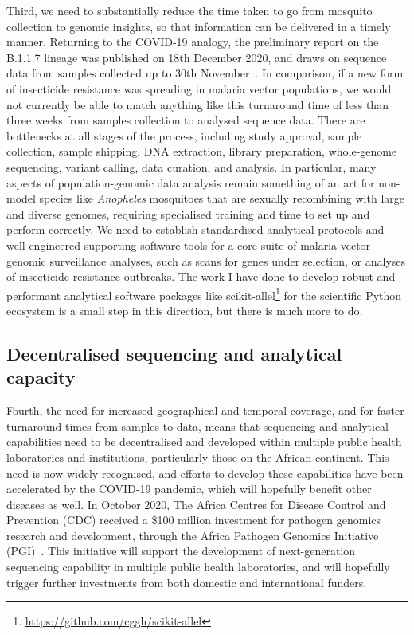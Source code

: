 \begin{refsection}
Third, we need to substantially reduce the time taken to go from mosquito collection to genomic insights, so that information can be delivered in a timely manner.
%
Returning to the COVID-19 analogy, the preliminary report on the B.1.1.7 lineage was published on 18th December 2020, and draws on sequence data from samples collected up to 30th November~\parencite{Rambaut2020}.
%
In comparison, if a new form of insecticide resistance was spreading in malaria vector populations, we would not currently be able to match anything like this turnaround time of less than three weeks from samples collection to analysed sequence data.
%
There are bottlenecks at all stages of the process, including study approval, sample collection, sample shipping, DNA extraction, library preparation, whole-genome sequencing, variant calling, data curation, and analysis.
%
In particular, many aspects of population-genomic data analysis remain something of an art for non-model species like \textit{Anopheles} mosquitoes that are sexually recombining with large and diverse genomes, requiring specialised training and time to set up and perform correctly.
%
We need to establish standardised analytical protocols and well-engineered supporting software tools for a core suite of malaria vector genomic surveillance analyses, such as scans for genes under selection, or analyses of insecticide resistance outbreaks.
%
The work I have done to develop robust and performant analytical software packages like scikit-allel\footnote{\url{https://github.com/cggh/scikit-allel}} for the scientific Python ecosystem is a small step in this direction, but there is much more to do.


\subsection{Decentralised sequencing and analytical capacity}


Fourth, the need for increased geographical and temporal coverage, and for faster turnaround times from samples to data, means that sequencing and analytical capabilities need to be decentralised and developed within multiple public health laboratories and institutions, particularly those on the African continent.
%
This need is now widely recognised, and efforts to develop these capabilities have been accelerated by the COVID-19 pandemic, which will hopefully benefit other diseases as well.
%
In October 2020, The Africa Centres for Disease Control and Prevention (CDC) received a \$100 million investment for pathogen genomics research and development, through the Africa Pathogen Genomics Initiative (PGI)~\parencite{Makoni2020}.
%
This initiative will support the development of next-generation sequencing capability in multiple public health laboratories, and will hopefully trigger further investments from both domestic and international funders.



\end{refsection}
